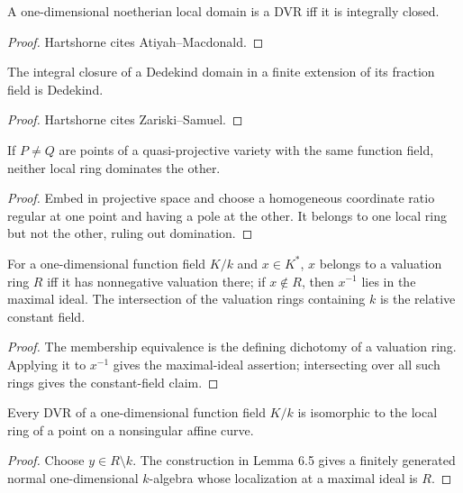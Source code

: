 \begin{theorem}
\label{thm:ha-ch1-6-2A}
A one-dimensional noetherian local domain is a DVR iff it is integrally closed.
\end{theorem}
\begin{proof}
Hartshorne cites Atiyah--Macdonald.
\end{proof}

\begin{theorem}
\label{thm:ha-ch1-6-3A}
The integral closure of a Dedekind domain in a finite extension of its fraction field is Dedekind.
\end{theorem}
\begin{proof}
Hartshorne cites Zariski--Samuel.
\end{proof}

\begin{lemma}
\label{lem:ha-ch1-6-4}
If $P\ne Q$ are points of a quasi-projective variety with the same function field, neither local
ring dominates the other.
\end{lemma}
\begin{proof}
Embed in projective space and choose a homogeneous coordinate ratio regular at one point and
having a pole at the other.  It belongs to one local ring but not the other, ruling out domination.
\end{proof}

\begin{lemma}
\label{lem:ha-ch1-6-5}
For a one-dimensional function field $K/k$ and $x\in K^*$, $x$ belongs to a valuation ring $R$
iff it has nonnegative valuation there; if $x\notin R$, then $x^{-1}$ lies in the maximal ideal.
The intersection of the valuation rings containing $k$ is the relative constant field.
\end{lemma}
\begin{proof}
The membership equivalence is the defining dichotomy of a valuation ring.  Applying it to $x^{-1}$
gives the maximal-ideal assertion; intersecting over all such rings gives the constant-field claim.
\end{proof}

\begin{corollary}
\label{cor:ha-ch1-6-6}
Every DVR of a one-dimensional function field $K/k$ is isomorphic to the local ring of a point on
a nonsingular affine curve.
\end{corollary}
\begin{proof}
Choose $y\in R\setminus k$.  The construction in Lemma 6.5 gives a finitely generated normal
one-dimensional $k$-algebra whose localization at a maximal ideal is $R$.
\end{proof}

